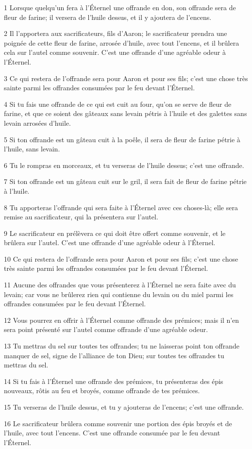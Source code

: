 \par 1 Lorsque quelqu'un fera à l'Éternel une offrande en don, son offrande sera de fleur de farine; il versera de l'huile dessus, et il y ajoutera de l'encens.
\par 2 Il l'apportera aux sacrificateurs, fils d'Aaron; le sacrificateur prendra une poignée de cette fleur de farine, arrosée d'huile, avec tout l'encens, et il brûlera cela sur l'autel comme souvenir. C'est une offrande d'une agréable odeur à l'Éternel.
\par 3 Ce qui restera de l'offrande sera pour Aaron et pour ses fils; c'est une chose très sainte parmi les offrandes consumées par le feu devant l'Éternel.
\par 4 Si tu fais une offrande de ce qui est cuit au four, qu'on se serve de fleur de farine, et que ce soient des gâteaux sans levain pétris à l'huile et des galettes sans levain arrosées d'huile.
\par 5 Si ton offrande est un gâteau cuit à la poêle, il sera de fleur de farine pétrie à l'huile, sans levain.
\par 6 Tu le rompras en morceaux, et tu verseras de l'huile dessus; c'est une offrande.
\par 7 Si ton offrande est un gâteau cuit sur le gril, il sera fait de fleur de farine pétrie à l'huile.
\par 8 Tu apporteras l'offrande qui sera faite à l'Éternel avec ces choses-là; elle sera remise au sacrificateur, qui la présentera sur l'autel.
\par 9 Le sacrificateur en prélèvera ce qui doit être offert comme souvenir, et le brûlera sur l'autel. C'est une offrande d'une agréable odeur à l'Éternel.
\par 10 Ce qui restera de l'offrande sera pour Aaron et pour ses fils; c'est une chose très sainte parmi les offrandes consumées par le feu devant l'Éternel.
\par 11 Aucune des offrandes que vous présenterez à l'Éternel ne sera faite avec du levain; car vous ne brûlerez rien qui contienne du levain ou du miel parmi les offrandes consumées par le feu devant l'Éternel.
\par 12 Vous pourrez en offrir à l'Éternel comme offrande des prémices; mais il n'en sera point présenté sur l'autel comme offrande d'une agréable odeur.
\par 13 Tu mettras du sel sur toutes tes offrandes; tu ne laisseras point ton offrande manquer de sel, signe de l'alliance de ton Dieu; sur toutes tes offrandes tu mettras du sel.
\par 14 Si tu fais à l'Éternel une offrande des prémices, tu présenteras des épis nouveaux, rôtis au feu et broyés, comme offrande de tes prémices.
\par 15 Tu verseras de l'huile dessus, et tu y ajouteras de l'encens; c'est une offrande.
\par 16 Le sacrificateur brûlera comme souvenir une portion des épis broyés et de l'huile, avec tout l'encens. C'est une offrande consumée par le feu devant l'Éternel.

